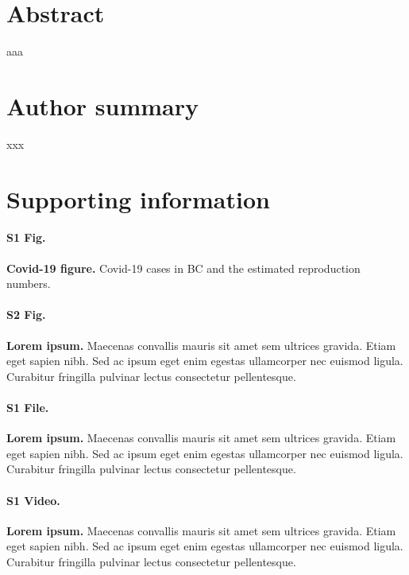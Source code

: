 \documentclass[10pt,letterpaper]{article}
\begin{document}
\section*{Abstract}
aaa

\section*{Author summary}
xxx

\linenumbers







\section*{Supporting information}

\paragraph*{S1 Fig.}
\label{S1_Fig}
{\bf Covid-19 figure.} Covid-19 cases in BC and the estimated reproduction numbers.

\paragraph*{S2 Fig.}
\label{S2_Fig}
{\bf Lorem ipsum.} Maecenas convallis mauris sit amet sem ultrices gravida. Etiam eget sapien nibh. Sed ac ipsum eget enim egestas ullamcorper nec euismod ligula. Curabitur fringilla pulvinar lectus consectetur pellentesque.

\paragraph*{S1 File.}
\label{S1_File}
{\bf Lorem ipsum.}  Maecenas convallis mauris sit amet sem ultrices gravida. Etiam eget sapien nibh. Sed ac ipsum eget enim egestas ullamcorper nec euismod ligula. Curabitur fringilla pulvinar lectus consectetur pellentesque.

\paragraph*{S1 Video.}
\label{S1_Video}
{\bf Lorem ipsum.}  Maecenas convallis mauris sit amet sem ultrices gravida. Etiam eget sapien nibh. Sed ac ipsum eget enim egestas ullamcorper nec euismod ligula. Curabitur fringilla pulvinar lectus consectetur pellentesque.
\end{document}
